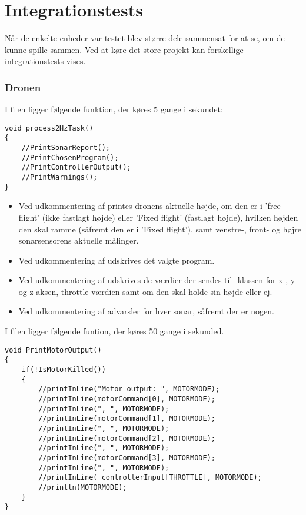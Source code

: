 \documentclass[Main]{subfiles}
\begin{document}
\chapter{Integrationstests}

Når de enkelte enheder var testet blev større dele sammensat for at se, om de kunne spille sammen.
Ved at køre det store projekt kan forskellige integrationstests vises.

\subsection{Dronen}
I filen  ligger følgende funktion, der køres 5 gange i sekundet:

\begin{lstlisting}[caption=process2HzTask()'s integrationstest, style=Code-C, label=lst:ref]
void process2HzTask()
{
	//PrintSonarReport();
	//PrintChosenProgram();
	//PrintControllerOutput();
	//PrintWarnings();
}
\end{lstlisting}

\begin{itemize}
\item Ved udkommentering af  printes dronens aktuelle højde, om den er i 'free flight' (ikke fastlagt højde) eller 'Fixed flight' (fastlagt højde), hvilken højden den skal ramme (såfremt den er i 'Fixed flight'), samt venstre-, front- og højre sonarsensorens aktuelle målinger.

\item Ved udkommentering af  udskrives det valgte program.

\item Ved udkommentering af  udskrives de værdier der sendes til -klassen for x-, y- og z-aksen, throttle-værdien samt om den skal holde sin højde eller ej.

\item Ved udkommentering af  advarsler for hver sonar, såfremt der er nogen.
\end{itemize}


\newpage
I filen  ligger følgende funtion, der køres 50 gange i sekunded.


\begin{lstlisting}[caption=lst:PrintMotorOutput()'s integrationstest, style=Code-C, label=lst:PrintMotorOutput]
void PrintMotorOutput()
{
	if(!IsMotorKilled())
	{
		//printInLine("Motor output: ", MOTORMODE);
		//printInLine(motorCommand[0], MOTORMODE);
		//printInLine(", ", MOTORMODE);
		//printInLine(motorCommand[1], MOTORMODE);
		//printInLine(", ", MOTORMODE);
		//printInLine(motorCommand[2], MOTORMODE);
		//printInLine(", ", MOTORMODE);
		//printInLine(motorCommand[3], MOTORMODE);
		//printInLine(", ", MOTORMODE);
		//printInLine(_controllerInput[THROTTLE], MOTORMODE);
		//println(MOTORMODE);
	}
}
\end{lstlisting}
\end{document}
